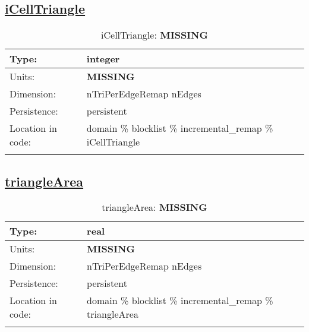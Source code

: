 \subsection[iCellTriangle]{\hyperref[sec:var_tab_incremental_remap]{iCellTriangle}}
\label{subsec:var_sec_incremental_remap_iCellTriangle}
\begin{center}
\begin{longtable}{| p{2.0in} | p{4.0in} |}
        \hline 
        Type: & integer \\
        \hline 
        Units: & {\bf \color{red} MISSING} \\
        \hline 
        Dimension: & nTriPerEdgeRemap nEdges \\
        \hline 
        Persistence: & persistent \\
        \hline 
         Location in code: & domain \% blocklist \% incremental\_remap \% iCellTriangle \\
         \hline 
    \caption{iCellTriangle: {\bf \color{red} MISSING}}
\end{longtable}
\end{center}
\subsection[triangleArea]{\hyperref[sec:var_tab_incremental_remap]{triangleArea}}
\label{subsec:var_sec_incremental_remap_triangleArea}
\begin{center}
\begin{longtable}{| p{2.0in} | p{4.0in} |}
        \hline 
        Type: & real \\
        \hline 
        Units: & {\bf \color{red} MISSING} \\
        \hline 
        Dimension: & nTriPerEdgeRemap nEdges \\
        \hline 
        Persistence: & persistent \\
        \hline 
         Location in code: & domain \% blocklist \% incremental\_remap \% triangleArea \\
         \hline 
    \caption{triangleArea: {\bf \color{red} MISSING}}
\end{longtable}
\end{center}
